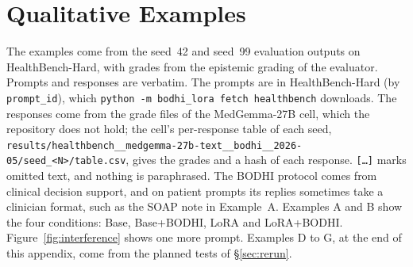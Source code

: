 \documentclass{article}
\newcommand{\bodhi}{BODHI}
\newcommand{\hbhard}{HealthBench-Hard}
\begin{document}
\section{Qualitative Examples}
\label{app:examples}

The examples come from the seed~42 and seed~99 evaluation outputs on \hbhard{}, with grades from
the epistemic grading of the evaluator. Prompts and responses are verbatim. The prompts are in
\hbhard{} (by \texttt{prompt\_id}), which \texttt{python -m bodhi\_lora fetch healthbench} downloads.
The responses come from the grade files of the MedGemma-27B cell, which the repository does not
hold; the cell's per-response table of each seed,
\texttt{results/healthbench\_\_medgemma-27b-text\_\_bodhi\_\_2026-05/seed\_<N>/table.csv}, gives
the grades and a hash of each response.
\texttt{[\ldots]} marks omitted text,
and nothing is paraphrased. The \bodhi{} protocol comes from clinical decision support, and on
patient prompts its replies sometimes take a clinician format, such as the SOAP note in
Example~A. Examples A and B show the four conditions: Base, Base+\bodhi{}, LoRA
and LoRA+\bodhi{}. Figure~\ref{fig:interference} shows one more prompt. Examples D to G, at the end
of this appendix, come from the planned tests of \S\ref{sec:rerun}.
\end{document}
